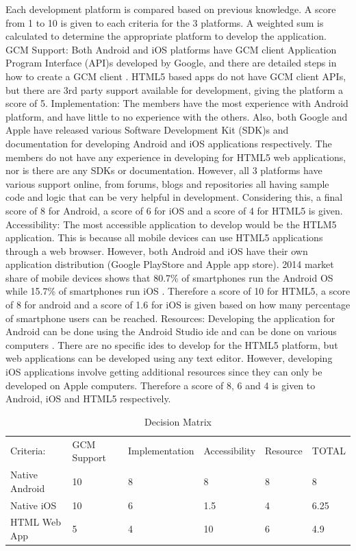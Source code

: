 \documentclass{article}
\begin{document}
Each development platform is compared based on previous knowledge. A score from 1 to 10 is given to each criteria for the 3 platforms. A weighted sum is calculated to determine the appropriate platform to develop the application.
GCM Support: Both Android and iOS platforms have GCM client Application Program Interface (API)s developed by Google, and there are detailed steps in how to create a GCM client \cite{gcm}. HTML5 based apps do not have GCM client APIs, but there are 3rd party support available for development, giving the platform a score of 5.
Implementation: The members have the most experience with Android platform, and have little to no experience with the others. Also, both Google and Apple have released various Software Development Kit (SDK)s and documentation for developing Android and iOS applications respectively. The members do not have any experience in developing for HTML5 web applications, nor is there are any SDKs or documentation. However, all 3 platforms have various support online, from forums, blogs and repositories all having sample code and logic that can be very helpful in development. Considering this, a final score of 8 for Android, a score of 6 for iOS and a score of 4 for HTML5 is given.
Accessibility: The most accessible application to develop would be the HTLM5 application. This is because all mobile devices can use HTML5 applications through a web browser. However, both Android and iOS have their own application distribution (Google PlayStore and Apple app store). 2014 market share of mobile devices shows that 80.7\% of smartphones run the Android OS while 15.7\% of smartphones run iOS \cite{market}. Therefore a score of 10 for HTML5, a score of 8 for android and a score of 1.6 for iOS is given based on how many percentage of smartphone users can be reached.
Resources: Developing the application for Android can be done using the Android Studio \gls{ide} and can be done on various computers \cite{astudio}. There are no specific \glspl{ide} to develop for the HTML5 platform, but web applications can be developed using any text editor. However, developing iOS applications involve getting additional resources since they can only be developed on Apple computers.  Therefore a score of 8, 6 and 4 is given to Android, iOS and HTML5 respectively.

\begin{table}[H]
\centering
\caption{Decision Matrix}
\label{fig:decision-matrix}
\begin{tabular}{llllll}
Criteria:      & GCM Support & Implementation & Accessibility & Resource & TOTAL \\
Native Android & 10          & 8              & 8             & 8        & 8     \\
Native iOS     & 10          & 6              & 1.5           & 4        & 6.25  \\
HTML Web App   & 5           & 4              & 10            & 6        & 4.9  
\end{tabular}
\end{table}
\end{document}
